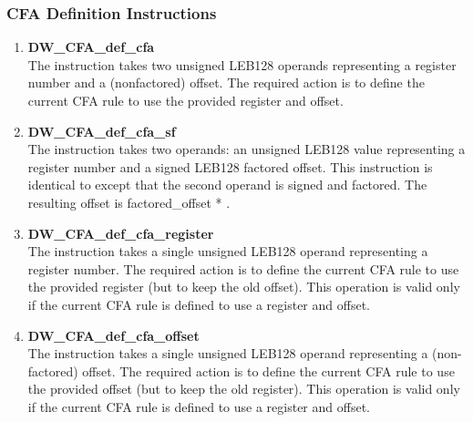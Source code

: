 \subsubsection{CFA Definition Instructions}
\label{chap:cfadefinitioninstructions}
\begin{enumerate}[1. ]

\item \textbf{DW\-\_CFA\-\_def\-\_cfa} \\
The 
instruction takes two unsigned LEB128
operands representing a register number and a (non\dash factored)
offset. The required action is to define the current CFA rule
to use the provided register and offset.

\item \textbf{ DW\-\_CFA\-\_def\-\_cfa\-\_sf} \\
The  instruction takes two operands:
an unsigned LEB128 value
representing a register number and a
signed LEB128 factored offset. This instruction is identical
to  except that the second operand is signed
and factored. The resulting offset is factored\_offset *
.


\item \textbf{DW\-\_CFA\-\_def\-\_cfa\-\_register} \\
The  
instruction takes a single
unsigned LEB128 operand representing a register number. The
required action is to define the current CFA rule to use
the provided register (but to keep the old offset). This
operation is valid only if the current CFA rule is defined
to use a register and offset.



\item \textbf{DW\-\_CFA\-\_def\-\_cfa\-\_offset} \\
The  instruction takes a single
unsigned LEB128 operand representing a (non-factored)
offset. The required action is to define the current CFA rule
to use the provided offset (but to keep the old register). This
operation is valid only if the current CFA rule is defined
to use a register and offset.



\end{enumerate}

